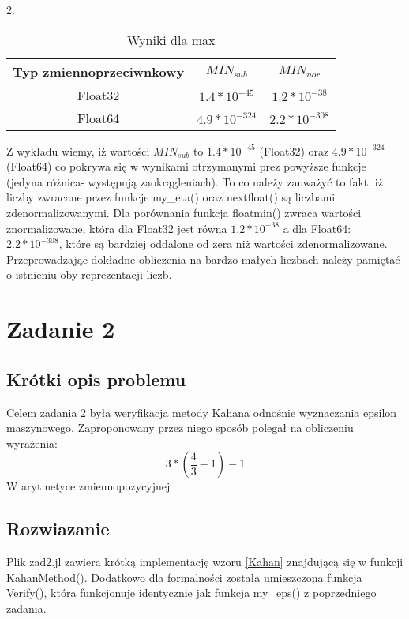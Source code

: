 \documentclass[a4paper,14pt]{report}
\begin{document}
2. 

\begin{table}[h!]
\centering
\begin{tabular}{|c | c | c |}
 \hline
 Typ zmiennoprzeciwnkowy & $MIN_{sub}$ & $MIN_{nor}$\\
 \hline\hline
 Float32 & $1.4*10^{-45} $  & $ 1.2*10^{-38} $  \\
 Float64 & $4.9*10^{-324} $ &  $2.2*10^{-308}$ \\
 \hline
\end{tabular}
\caption{Wyniki dla max}
\label{TableMax}
\end{table}

Z wykładu wiemy, iż wartości $MIN_{sub}$ to $1.4*10^{-45} $ (Float32) oraz $4.9*10^{-324} $ (Float64) co pokrywa się w wynikami otrzymanymi prez powyższe funkcje (jedyna różnica- występują zaokrągleniach). To co należy zauważyć to fakt, iż liczby zwracane przez funkcje my\_eta() oraz nextfloat() są liczbami zdenormalizowanymi. Dla porównania funkcja floatmin() zwraca wartości znormalizowane, która dla Float32 jest równa $ 1.2*10^{-38} $ a dla Float64: $2.2*10^{-308}$, które są bardziej oddalone od zera niż wartości zdenormalizowane. Przeprowadzając dokładne obliczenia na bardzo małych liczbach należy pamiętać o istnieniu oby reprezentacji liczb.






\chapter{Zadanie 2}
\section{Krótki opis problemu}
Celem zadania 2 była weryfikacja metody Kahana odnośnie wyznaczania epsilon maszynowego. Zaproponowany przez niego sposób polegał na obliczeniu wyrażenia:
\begin{equation}
  3*(\frac{4}{3}-1)-1
\label{Kahan}
\end{equation}
W arytmetyce zmiennopozycyjnej
\section{Rozwiazanie}
Plik zad2.jl zawiera krótką implementację wzoru \ref{Kahan} znajdującą się w funkcji KahanMethod(). Dodatkowo dla formalności została umieszczona funkcja Verify(), która funkcjonuje identycznie jak funkcja my\_eps() z poprzedniego zadania.
\end{document}
